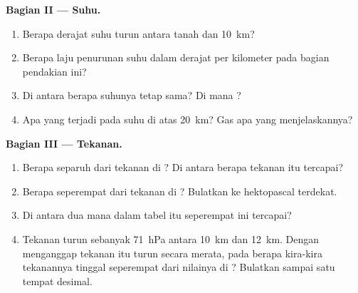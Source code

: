 \begin{problem}
\noindent\textbf{Bagian II --- Suhu.}\par\nopagebreak
\begin{enumerate}[resume, beginpenalty=10000]
  \item Berapa derajat suhu turun antara tanah dan \qty{10}{km}?
  \item Berapa laju penurunan suhu dalam derajat per kilometer pada bagian
        pendakian ini?
  \item Di antara  berapa suhunya tetap sama? Di mana
        ?
  \item Apa yang terjadi pada suhu di atas \qty{20}{km}? Gas apa yang
        menjelaskannya?
\end{enumerate}

\noindent\textbf{Bagian III --- Tekanan.}\par\nopagebreak
\begin{enumerate}[resume, beginpenalty=10000]
  \item Berapa separuh dari tekanan di ? Di antara 
        berapa tekanan itu tercapai?
  \item Berapa seperempat dari tekanan di ? Bulatkan ke
        hektopascal terdekat.
  \item Di antara dua  mana dalam tabel itu seperempat ini
        tercapai?
  \item Tekanan turun sebanyak \qty{71}{hPa} antara \qty{10}{km} dan
        \qty{12}{km}. Dengan menganggap tekanan itu turun secara merata,
        pada  berapa kira-kira tekanannya tinggal seperempat dari
        nilainya di ? Bulatkan sampai satu tempat desimal.
\end{enumerate}
\end{problem}
